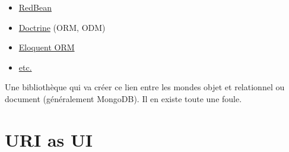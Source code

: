 \begin{itemize}
\tightlist
\item
  \href{http://www.redbeanphp.com/}{RedBean}
\item
  \href{http://www.doctrine-project.org/}{Doctrine} (ORM, ODM)
\item
  \href{http://laravel.com/docs/master/eloquent}{Eloquent ORM}
\item
  \href{https://en.wikipedia.org/wiki/List_of_object-relational_mapping_software\#PHP}{etc.}
\end{itemize}

Une bibliothèque qui va créer ce lien entre les mondes objet et
relationnel ou document (généralement MongoDB). Il en existe toute une
foule.

\begin{english}

\begin{Shaded}
\begin{Highlighting}[]
 
 \OtherTok{;}
\OtherTok{(}\OtherTok{);}
 \OtherTok{(}\NormalTok{ === }\OtherTok{)}\NormalTok{ \{}
    \NormalTok{ = }\OtherTok{(}\OtherTok{,} \OtherTok{);}
     \OtherTok{(}
        \OtherTok{,}
\OtherTok{(}\OtherTok{,} \OtherTok{)}
    \OtherTok{);}
\NormalTok{\} }\NormalTok{ \{}
    \NormalTok{ = }\OtherTok{(}\OtherTok{);}
     \OtherTok{(}
        \OtherTok{,}
\OtherTok{(}\OtherTok{,} \OtherTok{)}
    \OtherTok{);}
\NormalTok{\}}
\end{Highlighting}
\end{Shaded}

\end{english}

\hypertarget{uri-as-ui}{%
\section{URI as UI}\label{uri-as-ui}}

